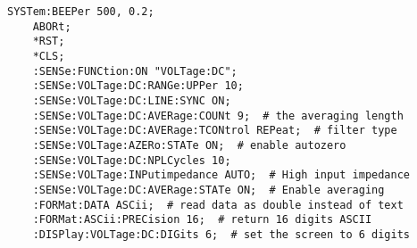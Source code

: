 \begin{lstlisting}[title=Keithley DMM6500]
    SYSTem:BEEPer 500, 0.2;
    ABORt;
    *RST;
    *CLS;
    :SENSe:FUNCtion:ON "VOLTage:DC";
    :SENSe:VOLTage:DC:RANGe:UPPer 10;
    :SENSe:VOLTage:DC:LINE:SYNC ON;
    :SENSe:VOLTage:DC:AVERage:COUNt 9;  # the averaging length
    :SENSe:VOLTage:DC:AVERage:TCONtrol REPeat;  # filter type
    :SENSe:VOLTage:AZERo:STATe ON;  # enable autozero
    :SENSe:VOLTage:DC:NPLCycles 10;
    :SENSe:VOLTage:INPutimpedance AUTO;  # High input impedance
    :SENSe:VOLTage:DC:AVERage:STATe ON;  # Enable averaging
    :FORMat:DATA ASCii;  # read data as double instead of text
    :FORMat:ASCii:PRECision 16;  # return 16 digits ASCII
    :DISPlay:VOLTage:DC:DIGits 6;  # set the screen to 6 digits
\end{lstlisting}
